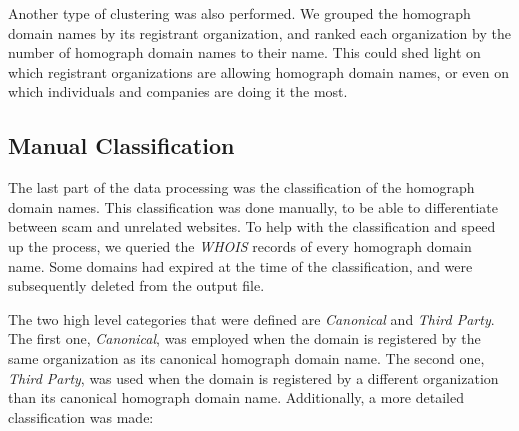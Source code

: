 \documentclass[letterpaper,twocolumn,10pt]{article}
\begin{document}
Another type of clustering was also performed.
We grouped the homograph domain names by its registrant organization, and ranked each organization by the number of homograph domain names to their name.
This could shed light on which registrant organizations are allowing homograph domain names, or even on which individuals and companies are doing it the most.

\subsection{Manual Classification}
The last part of the data processing was the classification of the homograph domain names.
This classification was done manually, to be able to differentiate between scam and unrelated websites.
To help with the classification and speed up the process, we queried the \textit{WHOIS} records of every homograph domain name.
Some domains had expired at the time of the classification, and were subsequently deleted from the output file.

The two high level categories that were defined are \textit{Canonical} and \textit{Third Party}.
The first one, \textit{Canonical}, was employed when the domain is registered by the same organization as its canonical homograph domain name.
The second one, \textit{Third Party}, was used when the domain is registered by a different organization than its canonical homograph domain name.
Additionally, a more detailed classification was made:
\end{document}
